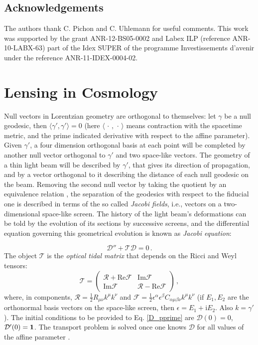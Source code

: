 \documentclass[twocolumn,aps,reprint, nofootinbib]{revtex4}
\newcommand{\ii}{{\mathrm{i}}}
\begin{document}
\subsection*{Acknowledgements}
The authors thank C. Pichon and C. Uhlemann for useful comments. This work was supported by the grant ANR-12-BS05-0002 and Labex ILP (reference ANR-10-LABX-63) part of the Idex SUPER of the programme Investissements d'avenir under the reference ANR-11-IDEX-0004-02.

%


\appendix
\section{Lensing in Cosmology}
\label{app_lens}
Null vectors in Lorentzian geometry are orthogonal to themselves: let $\gamma$ be a null geodesic, then $\langle \gamma', \gamma' \rangle = 0$ (here $\langle \, \cdot \, , \, \cdot \, \rangle$ means contraction with the spacetime metric, and the prime indicated derivative with respect to the affine parameter). Given $\gamma'$, a four dimension orthogonal basis at each point will be completed by another null vector orthogonal to $\gamma'$ and two space-like vectors. The geometry of a thin light beam will be described by $\gamma'$, that gives its direction of propagation, and by a vector orthogonal to it describing the distance of each null geodesic on the beam. Removing the second null vector by taking the quotient by an equivalence relation \cite{hawking_ellis}, the separation of the geodesics with respect to the fiducial one is described in terms of the so called \emph{Jacobi fields}, i.e., vectors on a two-dimensional space-like screen. The history of the light beam's deformations can be told by the evolution of its sections by successive screens, and the differential equation governing this geometrical evolution is known as \emph{Jacobi equation}:

\begin{equation}
\label{D_pprime}
\mathcal{D}'' + \mathcal{T} \mathcal{D} = 0 \, .
\end{equation}
The object $\mathcal{T}$ is the \emph{optical tidal matrix} that depends on the Ricci and Weyl tensors:
\begin{equation}
\mathcal{T} = \left( \begin{array}{cc}
\mathcal{R} + \mathrm{Re}\mathcal{F} & \mathrm{Im} \mathcal{F} \\
\mathrm{Im} \mathcal{F} & \mathcal{R} - \mathrm{Re} \mathcal{F}
\end{array} \right) \, ,
\end{equation}
where, in components, $\mathcal{R}=\frac{1}{2} R_{\mu \nu} k^{\mu} k^{\nu}$ and $\mathcal{F} = \frac{1}{2} \epsilon^{\alpha} \epsilon^{\beta}  C_{\alpha \mu \beta \nu} k^{\mu} k^{\nu}$  (if $E_1, E_2$ are the orthonormal basis vectors on the space-like screen, then $\epsilon = E_1 + \ii E_2$. Also $k = \gamma'$). The initial conditions to be provided to Eq. \eqref{D_pprime} are $\mathcal{D}(0) = 0$, $\mathcal{D}'(0) = \bold{1}$. The transport problem is solved once one knows $\mathcal{D}$ for all values of the affine parameter \cite{reimberg2013jacobi}.
\end{document}
